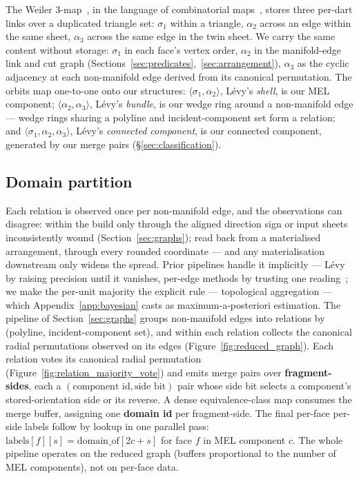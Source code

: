 \documentclass{egpubl}
\begin{document}
The Weiler 3-map~\cite{Weiler1985,Levy2025}, in the language of combinatorial maps~\cite{Lienhardt1988}, stores three per-dart links over a duplicated triangle set: $\sigma_1$ within a triangle, $\alpha_2$ across an edge within the same sheet, $\alpha_3$ across the same edge in the twin sheet. We carry the same content without storage: $\sigma_1$ in each face's vertex order, $\alpha_2$ in the manifold-edge link and cut graph (Sections~\ref{sec:predicates},~\ref{sec:arrangement}), $\alpha_3$ as the cyclic adjacency at each non-manifold edge derived from its canonical permutation. The orbits map one-to-one onto our structures: $\langle\sigma_1, \alpha_2\rangle$, L\'evy's \emph{shell}, is our MEL component; $\langle\alpha_2, \alpha_3\rangle$, L\'evy's \emph{bundle}, is our wedge ring around a non-manifold edge --- wedge rings sharing a polyline and incident-component set form a relation; and $\langle\sigma_1, \alpha_2, \alpha_3\rangle$, L\'evy's \emph{connected component}, is our connected component, generated by our merge pairs (\S\ref{sec:classification}).

\subsection{Domain partition}
\label{sec:aggregation}

Each relation is observed once per non-manifold edge, and the observations can disagree: within the build only through the aligned direction sign or input sheets inconsistently wound (Section~\ref{sec:graphs}); read back from a materialised arrangement, through every rounded coordinate --- and any materialisation downstream only widens the spread. Prior pipelines handle it implicitly --- L\'evy by raising precision until it vanishes, per-edge methods by trusting one reading~\cite{Levy2025,BohmRunge2025}; we make the per-unit majority the explicit rule --- topological aggregation --- which Appendix~\ref{app:bayesian} casts as maximum-a-posteriori estimation. The pipeline of Section~\ref{sec:graphs} groups non-manifold edges into relations by (polyline, incident-component set), and within each relation collects the canonical radial permutations observed on its edges (Figure~\ref{fig:reduced_graph}). Each relation votes its canonical radial permutation (Figure~\ref{fig:relation_majority_vote}) and emits merge pairs over \textbf{fragment-sides}, each a $(\text{component id}, \text{side bit})$ pair whose side bit selects a component's stored-orientation side or its reverse. A dense equivalence-class map consumes the merge buffer, assigning one \textbf{domain id} per fragment-side. The final per-face per-side labels follow by lookup in one parallel pass: $\text{labels}[f][s] = \text{domain\_of}[2c + s]$ for face $f$ in MEL component $c$. The whole pipeline operates on the reduced graph (buffers proportional to the number of MEL components), not on per-face data.
\end{document}
